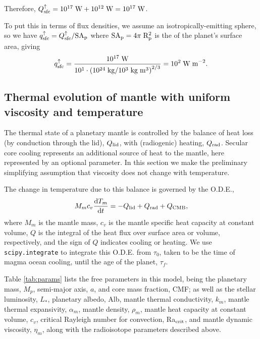 \documentclass[10pt,a4paper]{article}
\begin{document}
Therefore, $Q_{\rm sfc}^{\uparrow} = 10^{17} \; {\rm W} + 10^{12} \; {\rm W} = 10^{17} \; {\rm W}$.

To put this in terms of flux densities, we assume an isotropically-emitting sphere, so we have $q_{\rm sfc}^{\uparrow} = Q_{\rm sfc}^{\uparrow}/\rm{SA}_p$ where $\rm{SA}_p = 4\pi\;R_p^2$ is the of the planet's surface area, giving 
\begin{equation}
q_{\rm sfc}^{\uparrow} = \frac{10^{17} \; {\rm W}}{10^1 \cdot \left(10^{24}\;{\rm kg}/10^3 \; {\rm kg}\;{\rm m}^3\right)^{2/3}} = 10^2 \; \rm{W\;m}^{-2}.
\end{equation}

\subsection{Thermal evolution of mantle with uniform viscosity and temperature}

The thermal state of a planetary mantle is controlled by the balance of heat loss (by conduction through the lid), $Q_{\rm lid}$, with (radiogenic) heating, $Q_{\rm rad}$. Secular core cooling represents an additional source of heat to the mantle, here represented by an optional parameter. In this section we make the preliminary simplifying assumption that viscosity does not change with temperature.

The change in temperature due to this balance is governed by the O.D.E.,
\begin{equation}
M_m c_v \frac{{\rm d}T_m}{{\rm d}t} = -Q_{\rm lid} + Q_{\rm rad} + Q_{\rm CMB},
\end{equation}
where $M_m$ is the mantle mass, $c_v$ is the mantle specific heat capacity at constant volume, $Q$ is the integral of the heat flux over surface area or volume, respectively, and the sign of $Q$ indicates cooling or heating. We use {\tt scipy.integrate} to integrate this O.D.E. from $\tau_0$, taken to be the time of magma ocean cooling, until the age of the planet, $\tau_f$.  

Table \ref{tab:params} lists the free parameters in this model, being the planetary mass, $M_p$, semi-major axis, $a$, and core mass fraction, CMF; as well as the stellar luminosity, $L_*$, planetary albedo, Alb, mantle thermal conductivity, $k_m$, mantle thermal expansivity, $\alpha_m$, mantle density, $\rho_m$, mantle heat capacity at constant volume, $c_v$, critical Rayleigh number for convection, Ra$_{\rm crit}$, and mantle dynamic viscosity, $\eta_m$, along with the radioisotope parameters described above.
\end{document}
